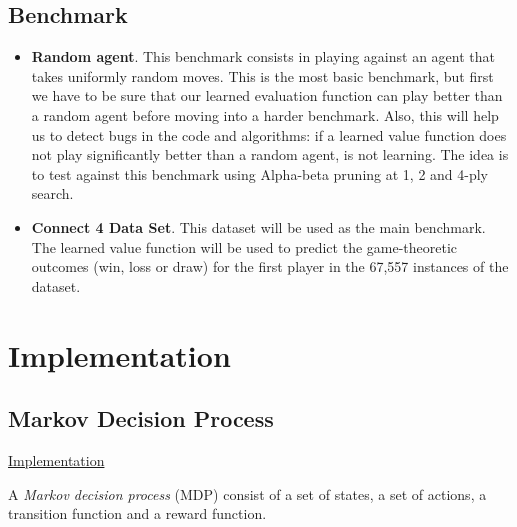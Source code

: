 \documentclass{article}
\begin{document}
\subsection{Benchmark}
\label{sec:benchmark}

\begin{itemize}

    \item \textbf{Random agent}. This benchmark consists in playing against an agent that takes
        uniformly random moves. This is the most basic benchmark, but first we have to be sure that
        our learned evaluation function can play better than a random agent before moving into a
        harder benchmark. Also, this will help us to detect bugs in the code and algorithms: if a
        learned value function does not play significantly better than a random agent, is not
        learning. The idea is to test against this benchmark using Alpha-beta pruning at 1, 2 and
        4-ply search.

    \item \textbf{Connect 4 Data Set}. This dataset will be used as the main benchmark. The learned
        value function will be used to predict the game-theoretic outcomes (win, loss or draw) for
        the first player in the 67,557 instances of the dataset.

\end{itemize}

\section{Implementation}

\subsection{Markov Decision Process}

\noindent
\href{https://github.com/davidrobles/mlnd-capstone-code/blob/master/capstone/mdp/mdp.py}
     {Implementation}
\break

A \emph{Markov decision process} (MDP) consist of a set of states, a set of actions, a transition
function and a reward function.
\end{document}
